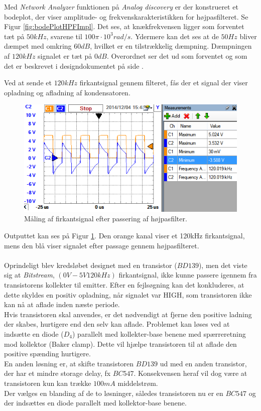 Med \textit{Network Analyzer} funktionen på \textit{Analog discovery} er der konstrueret et bodeplot, der viser amplitude- og frekvenskarakteristikken for højpasfilteret. Se Figur \ref{fig:bodePlotHPFImpl}. Det ses, at knækfrekvensen ligger som forventet tæt på $50kHz$, svarene til $100\pi \cdot 10^{3} rad/s$. Ydermere kan det ses at de $50Hz$ bliver dæmpet med omkring $60dB$, hvilket er en tilstrækkelig dæmpning. Dæmpningen af $120kHz$ signalet er tæt på $0dB$. Overordnet ser det ud som forventet og som det er beskrevet i designdokumentet på side \pageref{subSecCarrierGen}.

Ved at sende et $120kHz$ firkantsignal gennem filteret, fås der et signal der viser opladning og afladning af kondensatoren.

\begin{figure}[h]
	\centering
	\includegraphics[width={\textwidth - 0.5 cm}, trim=0 0 0 0, clip=true]{../Implementering/billeder/filtermaaling.png}
	\caption{Måling af firkantsignal efter passering af højpasfilter.}
	\label{fig:filtermaaling}
\end{figure}

Outputtet kan ses på Figur \ref{fig:filtermaaling}. Den orange kanal viser et 120kHz firkantsignal, mens den blå viser signalet efter passage gennem højpasfilteret.\\
\\
Oprindeligt blev kredsløbet designet med en transistor ($BD139$)\cite{lib:BD139}, men det viste sig at \textit{Bitstream}, $(0V-5V 120kHz)$ firkantsignal, ikke kunne passere igennem fra transistorens kollekter til emitter. Efter en fejlsøgning kan det konkluderes, at dette skyldes en positiv opladning, når signalet var HIGH, som transistoren ikke kan nå at aflade inden næste periode. \\
Hvis transistoren skal anvendes, er det nødvendigt at fjerne den positive ladning der skabes, hurtigere end den selv kan aflade. Problemet kan løses ved at indsætte en diode ($D_{4}$)\cite{lib:1N4148} parallelt med kollekter-base benene med spærreretning mod kollektor (Baker clamp)\cite{lib:BakerClamp}. Dette vil hjælpe transistoren til at aflade den positive spænding hurtigere.\\
En anden løsning er, at skifte transistoren $BD139$ ud med en anden transistor, der har et mindre storage delay, fx $BC547$\cite{lib:BC547}. Konsekvensen heraf vil dog være at transistoren kun kan trække $100mA$ middelstrøm.\\
Der vælges en blanding af de to løsninger, således transistoren nu er en $BC547$ og der indsættes en diode parallelt med kollektor-base benene.

